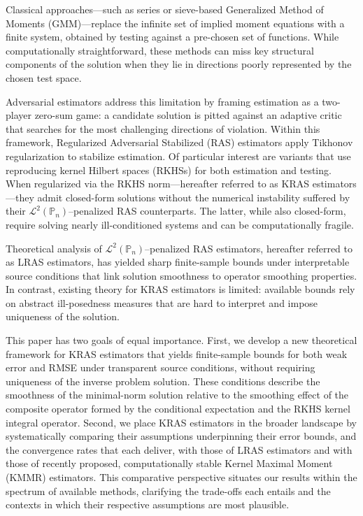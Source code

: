 \documentclass[twoside,11pt]{article}
\begin{document}
Classical approaches---such as series or sieve-based Generalized Method of Moments (GMM)---replace the infinite set of implied moment equations with a finite system, obtained by testing against a pre-chosen set of functions. While computationally straightforward, these methods can miss key structural components of the solution when they lie in directions poorly represented by the chosen test space.

Adversarial estimators \citep{bennett2019deep, muandet2020dual, muandet2020kernel, dikkala2020minimax, liao2020provably, kallus2021causal, ghassami2022minimax, mastouri2021proximal, bennett2022inference, zhang2023instrumental, bennett2023minimax, bennett2023source, park2024proximal} address this limitation by framing estimation as a two-player zero-sum game: a candidate solution is pitted against an adaptive critic that searches for the most challenging directions of violation. Within this framework, Regularized Adversarial Stabilized (RAS) estimators apply Tikhonov regularization to stabilize estimation. Of particular interest are variants that use reproducing kernel Hilbert spaces (RKHSs) for both estimation and testing. When regularized via the RKHS norm---hereafter referred to as KRAS estimators---they admit closed-form solutions without the numerical instability suffered by their $\mathcal{L}^2(\mathbb{P}_n)$--penalized RAS counterparts. The latter, while also closed-form, require solving nearly ill-conditioned systems and can be computationally fragile.

Theoretical analysis of $\mathcal{L}^2(\mathbb{P}_n)$--penalized RAS estimators, hereafter referred to as LRAS estimators, has yielded sharp finite-sample bounds under interpretable source conditions that link solution smoothness to operator smoothing properties. In contrast, existing theory for KRAS estimators is limited: available bounds rely on abstract ill-posedness measures that are hard to interpret and impose uniqueness of the solution.

This paper has two goals of equal importance. First, we develop a new theoretical framework for KRAS estimators that yields finite-sample bounds for both weak error and RMSE under transparent source conditions, without requiring uniqueness of the inverse problem solution. These conditions describe the smoothness of the minimal-norm solution relative to the smoothing effect of the composite operator formed by the conditional expectation and the RKHS kernel integral operator. Second, we place KRAS estimators in the broader landscape by systematically comparing their assumptions underpinning their error bounds, and the convergence rates that each deliver, with those of LRAS estimators and with those of recently proposed, computationally stable Kernel Maximal Moment (KMMR) estimators. This comparative perspective situates our results within the spectrum of available methods, clarifying the trade-offs each entails and the contexts in which their respective assumptions are most plausible. 
\end{document}

